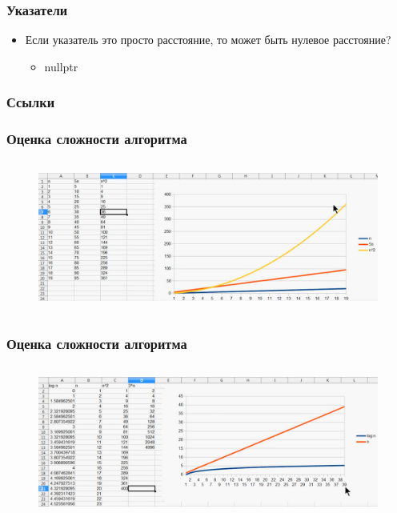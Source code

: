 \documentclass[russian, 12pt]{beamer}
\begin{document}
\begin{frame}
\frametitle{Указатели}
\begin{itemize}
  \item Если указатель это просто расстояние, то может быть нулевое расстояние?
    \begin{itemize}
      \item nullptr
    \end{itemize}
\end{itemize}
\end{frame}
\begin{frame}
\frametitle{Ссылки}
\end{frame}
\begin{frame}
\frametitle{Оценка сложности алгоритма}
\begin{figure}
  \includegraphics[width=\linewidth, height=5cm]{img/scal_1.png}
\end{figure}
\end{frame}
\begin{frame}
\frametitle{Оценка сложности алгоритма}
\begin{figure}
  \includegraphics[width=\linewidth, height=5cm]{img/scal_2.png}
\end{figure}
\end{frame}
\end{document}
